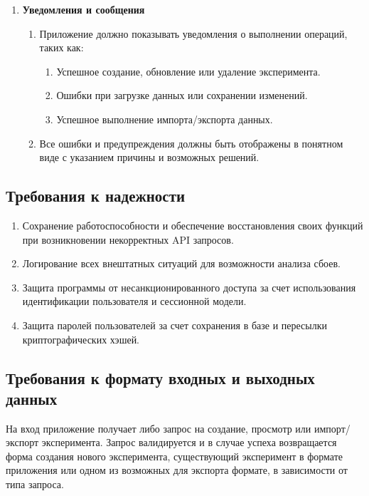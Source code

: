 \documentclass[a4paper,12pt,reqno]{article}
\begin{document}
\begin{enumerate}
        \item \textbf{Уведомления и сообщения}
        \begin{enumerate}[label=\arabic{enumi}.\arabic*.]
            \item Приложение должно показывать уведомления о выполнении операций, таких как:
            \begin{enumerate}[label=\arabic{enumi}.\arabic{enumii}.\arabic*.]
                \item Успешное создание, обновление или удаление эксперимента.
                \item Ошибки при загрузке данных или сохранении изменений.
                \item Успешное выполнение импорта/экспорта данных.
            \end{enumerate}
            \item Все ошибки и предупреждения должны быть отображены в понятном виде с указанием причины и возможных решений.
        \end{enumerate}
    \end{enumerate}

    \subsection{Требования к надежности}
    \begin{enumerate}
        \item Сохранение работоспособности и обеспечение восстановления своих функций при возникновении некорректных API запросов.
        \item Логирование всех внештатных ситуаций для возможности анализа сбоев.
        \item Защита программы от несанкционированного доступа за счет использования идентификации пользователя и сессионной модели.
        \item Защита паролей пользователей за счет сохранения в базе и пересылки криптографических хэшей.
    \end{enumerate}

    \subsection{Требования к формату входных и выходных данных}
    На вход приложение получает либо запрос на создание, просмотр или импорт/экспорт эксперимента.
    Запрос валидируется и в случае успеха возвращается форма создания нового эксперимента, существующий эксперимент в формате приложения или одном из возможных для экспорта формате, в зависимости от типа запроса.
\end{document}
